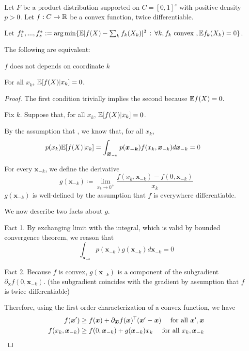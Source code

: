  \begin{proposition}
Let $F$ be a product distribution supported on $C=[0,1]^s$ with positive density $p > 0$. Let $f: C \rightarrow {\mathbb R}$ be a convex function, twice differentiable. 

Let $f^*_1,...,f^*_s := \arg\min \{ {\mathbb E} | f(X) - \sum_k f_k(X_k) |^2 \,:\, \forall k, f_k \textrm{ convex }, {\mathbb E} f_k(X_k) = 0\}$.

The following are equivalent:
\begin{packed_enum}
\item $f$ does not depends on coordinate $k$
\item For all $x_k$, ${\mathbb E}[ f(X) | x_k] = 0$.
\end{packed_enum}
\end{proposition}

\begin{proof}

The first condition trivially implies the second because ${\mathbb E} f(X) = 0$.

Fix $k$. Suppose that, for all $x_k$, ${\mathbb E}[ f(X) | x_k] = 0$. 

By the assumption that , we know that, for all $x_k$,
\begin{align*}
p(x_k) {\mathbb E}[ f(X) | x_k ] &=  \int_{\mbox{\boldmath $x$}_{-k}} p(\mbox{\boldmath $x_{-k}$}) f(x_k,\mbox{\boldmath $x$}_{-k}) d \mbox{\boldmath $x$}_{-k} =0
\end{align*}

For every $\mathbf{x}_{-k}$, we define the derivative
\[
g(\mathbf{x}_{-k}) \coloneqq  \lim_{x_k \rightarrow 0^+} \frac{f(x_k, \mathbf{x}_{-k}) - f(0, \mathbf{x}_{-k})}{x_k}
\]
$g(\mathbf{x}_{-k})$ is well-defined by the assumption that $f$ is everywhere differentiable.

We now describe two facts about $g$.

Fact 1. By exchanging limit with the integral, which is valid by bounded convergence theorem, we reason that 
\[
\int_{\mathbf{x}_{-k}} p(\mathbf{x}_{-k}) g(\mathbf{x}_{-k}) d \mathbf{x}_{-k} = 0
\]

Fact 2. Because $f$ is convex, $g(\mathbf{x}_{-k})$ is a component of the subgradient $\partial_{\mathbf{x}} f(0, \mathbf{x}_{-k})$. (the subgradient coincides with the gradient by assumption that $f$ is twice differentiable)

Therefore, using the first order characterization of a convex function, we have
\begin{align*}
f(\mbox{\boldmath $x$}') &\geq f( \mbox{\boldmath $x$}) + \partial_{\mbox{\boldmath $x$}} f(\mbox{\boldmath $x$})^{\mathsf{T}} (\mbox{\boldmath $x$}' - \mbox{\boldmath $x$}) \quad \textrm{ for all } \mbox{\boldmath $x$}', \mbox{\boldmath $x$} \\
f(x_k, \mbox{\boldmath $x$}_{-k}) &\geq f(0, \mbox{\boldmath $x$}_{-k}) + g(\mbox{\boldmath $x$}_{-k}) x_k \quad \textrm{ for all } x_k, \mbox{\boldmath $x$}_{-k}
\end{align*}



\end{proof}
